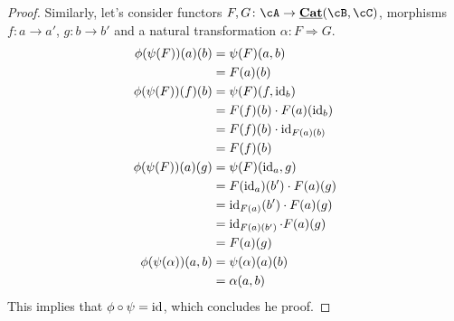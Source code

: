 \documentclass[a4paper,11pt,openany]{scrartcl}
\begin{document}
\begin{proof}
    Similarly, let's consider functors $F,G\colon\cA\rightarrow\underline{\Cat}(\cB,\cC)$,
    morphisms $f\colon a\rightarrow a'$, $g\colon b\rightarrow b'$ and a natural
    transformation $\alpha\colon F\Rightarrow G$.
    \begin{align*}
        \phi(\psi(F))(a)(b) &=\psi(F)(a,b) \\
        &=F(a)(b) \\
        \phi(\psi(F))(f)(b) &=\psi(F)(f,\operatorname{id}_b) \\
        &=F(f)(b)\cdot F(a)(\operatorname{id}_b) \\
        &=F(f)(b)\cdot\operatorname{id}_{F(a)(b)} \\
        &=F(f)(b) \\
        \phi(\psi(F))(a)(g) &=\psi(F)(\operatorname{id}_a,g) \\
        &=F(\operatorname{id}_a)(b')\cdot F(a)(g) \\
        &=\operatorname{id}_{F(a)}(b')\cdot F(a)(g) \\
        &=\operatorname{id}_{F(a)(b')}\cdot F(a)(g) \\
        &=F(a)(g) \\
        \phi(\psi(\alpha))(a,b) &=\psi(\alpha)(a)(b) \\
        &=\alpha(a,b)
    \end{align*}
    This implies that $\phi\circ\psi=\operatorname{id}$, which concludes he proof.
\end{proof}
\end{document}
